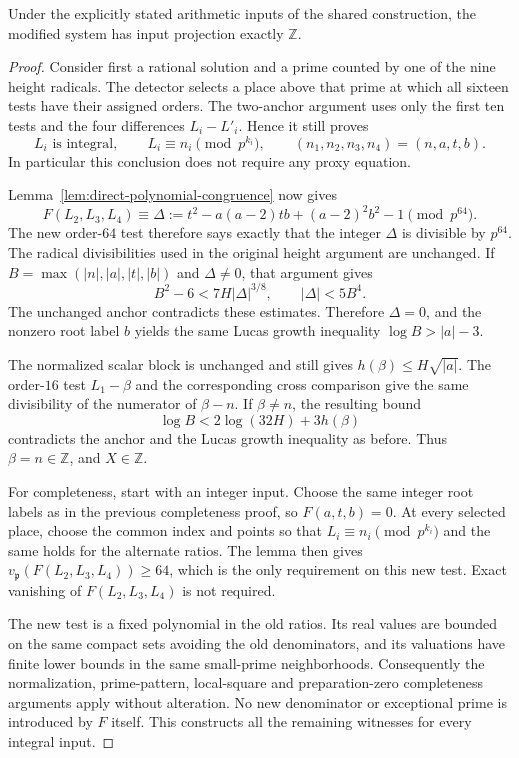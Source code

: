\begin{proposition}
\label{prop:direct-Lucas-preservation}
Under the explicitly stated arithmetic inputs of the shared
construction, the modified system has input projection exactly
$\mathbb Z$.
\end{proposition}
\begin{proof}
Consider first a rational solution and a prime counted by one
of the nine height radicals.  The detector selects a place
above that prime at which all sixteen tests have their assigned
orders.  The two-anchor argument uses only the first ten tests
and the four differences $L_i-L'_i$.  Hence it still proves
\[
 L_i\text{ is integral},\qquad
 L_i\equiv n_i\pmod{p^{k_i}},
 \qquad(n_1,n_2,n_3,n_4)=(n,a,t,b).
\]
In particular this conclusion does not require any proxy equation.

Lemma~\ref{lem:direct-polynomial-congruence} now gives
\[
 F(L_2,L_3,L_4)\equiv
 \Delta:=t^2-a(a-2)tb+(a-2)^2b^2-1\pmod{p^{64}}.
\]
The new order-$64$ test therefore says exactly that the integer
$\Delta$ is divisible by $p^{64}$.  The radical divisibilities
used in the original height argument are unchanged.  If
$B=\max(|n|,|a|,|t|,|b|)$ and $\Delta\ne0$, that argument
gives
\[
 B^2-6<7H|\Delta|^{3/8},\qquad |\Delta|<5B^4.
\]
The unchanged anchor contradicts these estimates.  Therefore
$\Delta=0$, and the nonzero root label $b$ yields the same
Lucas growth inequality $\log B>|a|-3$.

The normalized scalar block is unchanged and still gives
$h(\beta)\le H\sqrt{|a|}$.  The order-$16$ test $L_1-\beta$
and the corresponding cross comparison give the same divisibility
of the numerator of $\beta-n$.  If $\beta\ne n$, the resulting
bound
\[
                    \log B<2\log(32H)+3h(\beta)
\]
contradicts the anchor and the Lucas growth inequality as before.
Thus $\beta=n\in\mathbb Z$, and $X\in\mathbb Z$.

For completeness, start with an integer input.  Choose the same
integer root labels as in the previous completeness proof, so
$F(a,t,b)=0$.  At every selected place, choose the common index
and points so that $L_i\equiv n_i\pmod{p^{k_i}}$ and the same
holds for the alternate ratios.  The lemma then gives
$v_{\mathfrak p}(F(L_2,L_3,L_4))\ge64$, which is the only
requirement on this new test.  Exact vanishing of $F(L_2,L_3,L_4)$
is not required.

The new test is a fixed polynomial in the old ratios.  Its real
values are bounded on the same compact sets avoiding the old
denominators, and its valuations have finite lower bounds in the
same small-prime neighborhoods.  Consequently the normalization,
prime-pattern, local-square and preparation-zero completeness
arguments apply without alteration.  No new denominator or
exceptional prime is introduced by $F$ itself.  This constructs
all the remaining witnesses for every integral input.
\end{proof}

